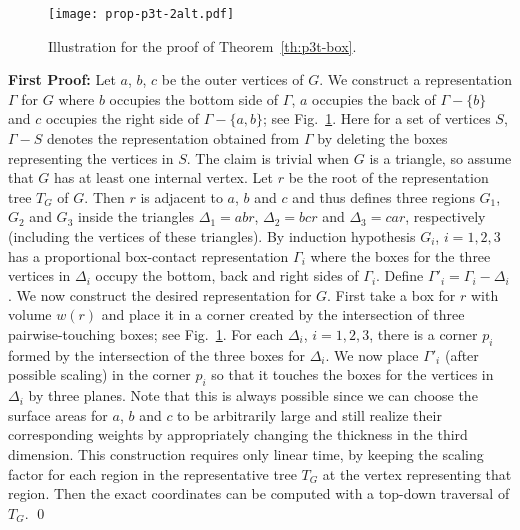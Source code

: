 \documentclass{llncs}
\begin{document}
\begin{figure}[t]
\centering
\texttt{[image: prop-p3t-2alt.pdf]}
\caption{Illustration for the proof of Theorem~\ref{th:p3t-box}.}
\label{fig:prop-p3t-2}
\end{figure}



\noindent
\textbf{First Proof:}
Let $a$, $b$, $c$ be the outer vertices of $G$. We construct a representation $\Gamma$ for
 $G$ where $b$ occupies the bottom side of $\Gamma$, $a$ occupies the back of
 $\Gamma-\{b\}$ and $c$ occupies the right side of $\Gamma-\{a,b\}$; see
 Fig.~\ref{fig:prop-p3t-2}. 
 Here for a set of vertices $S$, $\Gamma-S$ denotes the representation obtained from $\Gamma$ by deleting
 the boxes representing the vertices in $S$. The claim is trivial when
 $G$ is a triangle, so assume that $G$ has at least one internal vertex. Let $r$
 be the root of the representation tree $T_G$ of $G$. Then $r$ is adjacent to $a$, $b$ and $c$
 and thus defines three regions $G_1$, $G_2$ and $G_3$ inside the triangles $\Delta_1=abr$,
 $\Delta_2=bcr$ and $\Delta_3=car$, respectively (including the vertices of these triangles).
 By induction hypothesis $G_i$, $i=1,2,3$ has a proportional box-contact representation
 $\Gamma_i$ where the boxes for the three vertices in $\Delta_i$ occupy the bottom, back
 and right sides of $\Gamma_i$. Define $\Gamma'_i=\Gamma_i-\Delta_i$. We now construct
 the desired representation for $G$. First take a box for $r$ with volume $w(r)$ and place it in
 a corner created by the intersection of three pairwise-touching boxes; see
 Fig.~\ref{fig:prop-p3t-2}.  For each $\Delta_i$, $i=1,2,3$, there is a corner $p_i$ formed by the
 intersection of the three boxes for $\Delta_i$. We now place $\Gamma'_i$ (after possible
 scaling) in the corner $p_i$ so that it touches the boxes for the vertices in $\Delta_i$ by
 three planes. Note that this is always possible since we can choose the surface areas for $a$, $b$ and $c$ to
 be arbitrarily large and still realize their corresponding weights
by appropriately changing the thickness in the third dimension.
This construction requires only linear time, by keeping the scaling factor for each
 region in the representative tree $T_G$ at the vertex representing
 that region. 
Then the exact coordinates can be computed with a top-down traversal of $T_G$. \qed
\end{document}
